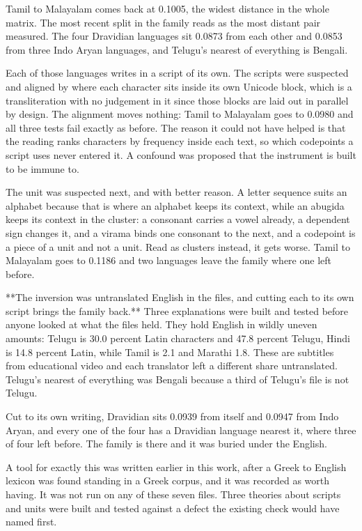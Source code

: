 Tamil to Malayalam comes back at 0.1005, the widest distance in the whole matrix. The most recent split in the family reads as the most distant pair measured. The four Dravidian languages sit 0.0873 from each other and 0.0853 from three Indo Aryan languages, and Telugu's nearest of everything is Bengali.

Each of those languages writes in a script of its own. The scripts were suspected and aligned by where each character sits inside its own Unicode block, which is a transliteration with no judgement in it since those blocks are laid out in parallel by design. The alignment moves nothing: Tamil to Malayalam goes to 0.0980 and all three tests fail exactly as before. The reason it could not have helped is that the reading ranks characters by frequency inside each text, so which codepoints a script uses never entered it. A confound was proposed that the instrument is built to be immune to.

The unit was suspected next, and with better reason. A letter sequence suits an alphabet because that is where an alphabet keeps its context, while an abugida keeps its context in the cluster: a consonant carries a vowel already, a dependent sign changes it, and a virama binds one consonant to the next, and a codepoint is a piece of a unit and not a unit. Read as clusters instead, it gets worse. Tamil to Malayalam goes to 0.1186 and two languages leave the family where one left before.

**The inversion was untranslated English in the files, and cutting each to its own script brings the family back.** Three explanations were built and tested before anyone looked at what the files held. They hold English in wildly uneven amounts: Telugu is 30.0 percent Latin characters and 47.8 percent Telugu, Hindi is 14.8 percent Latin, while Tamil is 2.1 and Marathi 1.8. These are subtitles from educational video and each translator left a different share untranslated. Telugu's nearest of everything was Bengali because a third of Telugu's file is not Telugu.

Cut to its own writing, Dravidian sits 0.0939 from itself and 0.0947 from Indo Aryan, and every one of the four has a Dravidian language nearest it, where three of four left before. The family is there and it was buried under the English.

A tool for exactly this was written earlier in this work, after a Greek to English lexicon was found standing in a Greek corpus, and it was recorded as worth having. It was not run on any of these seven files. Three theories about scripts and units were built and tested against a defect the existing check would have named first.

